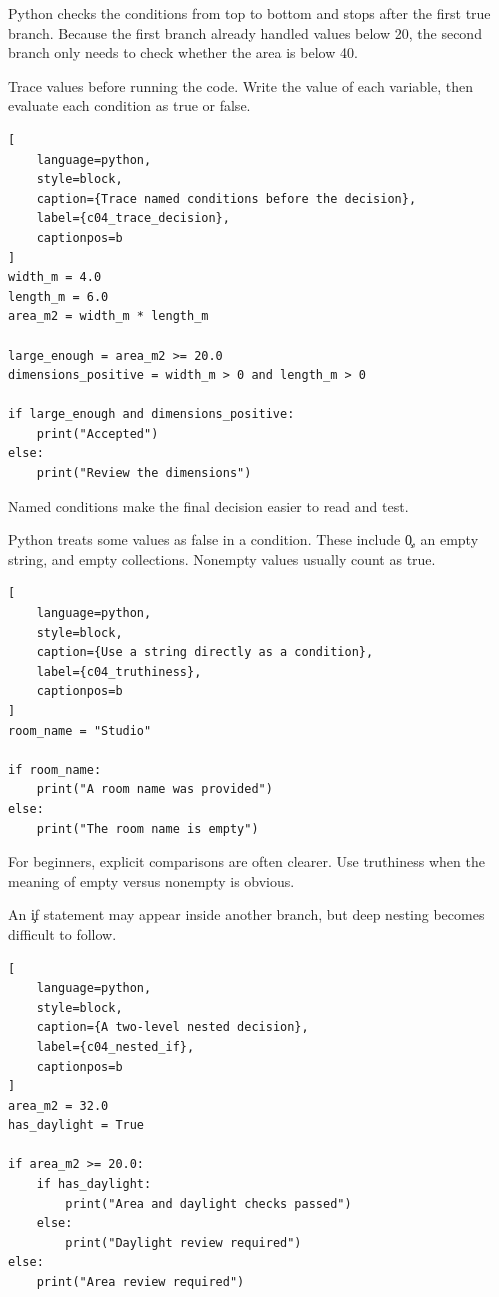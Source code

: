 Python checks the conditions from top to bottom and stops after the first true
branch. Because the first branch already handled values below 20, the second
branch only needs to check whether the area is below 40.


Trace values before running the code. Write the value of each variable, then
evaluate each condition as true or false.

\begin{lstlisting}[
    language=python,
    style=block,
    caption={Trace named conditions before the decision},
    label={c04_trace_decision},
    captionpos=b
]
width_m = 4.0
length_m = 6.0
area_m2 = width_m * length_m

large_enough = area_m2 >= 20.0
dimensions_positive = width_m > 0 and length_m > 0

if large_enough and dimensions_positive:
    print("Accepted")
else:
    print("Review the dimensions")
\end{lstlisting}

Named conditions make the final decision easier to read and test.


Python treats some values as false in a condition. These include \c{0}, an
empty string, and empty collections. Nonempty values usually count as true.

\begin{lstlisting}[
    language=python,
    style=block,
    caption={Use a string directly as a condition},
    label={c04_truthiness},
    captionpos=b
]
room_name = "Studio"

if room_name:
    print("A room name was provided")
else:
    print("The room name is empty")
\end{lstlisting}

For beginners, explicit comparisons are often clearer. Use truthiness when the
meaning of empty versus nonempty is obvious.


An \c{if} statement may appear inside another branch, but deep nesting becomes
difficult to follow.

\begin{lstlisting}[
    language=python,
    style=block,
    caption={A two-level nested decision},
    label={c04_nested_if},
    captionpos=b
]
area_m2 = 32.0
has_daylight = True

if area_m2 >= 20.0:
    if has_daylight:
        print("Area and daylight checks passed")
    else:
        print("Daylight review required")
else:
    print("Area review required")
\end{lstlisting}

